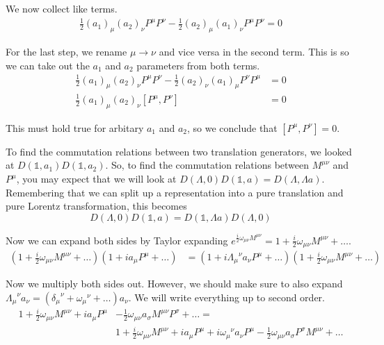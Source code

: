 \documentclass[12pt]{article}
\begin{document}
We now collect like terms.
\begin{align*}
    \frac{1}{2}(a_1)_\mu(a_2)_\nu P^\mu P^\nu-\frac{1}{2}(a_2)_\mu(a_1)_\nu P^\mu P^\nu = 0
\end{align*}

For the last step, we rename $\mu\rightarrow\nu$ and vice versa in the second term. This is so we can take out the $a_1$ and $a_2$ parameters from both terms.
\begin{align*}
    \frac{1}{2}(a_1)_\mu(a_2)_\nu P^\mu P^\nu-\frac{1}{2}(a_2)_\nu(a_1)_\mu P^\nu P^\mu &= 0 \\
    \frac{1}{2}(a_1)_\mu(a_2)_\nu [P^\mu,P^\nu]&=0
\end{align*}

This must hold true for arbitary $a_1$ and $a_2$, so we conclude that $[P^\mu,P^\nu]=0$.

To find the commutation relations between two translation generators, we looked at $D(\mathbb{1},a_1)D(\mathbb{1},a_2)$. So, to find the commutation relations between $M^{\mu\nu}$ and $P^\mu$, you may expect that we will look at $D(\Lambda,0)D(\mathbb{1},a)=D(\Lambda,\Lambda a)$. Remembering that we can split up a representation into a pure translation and pure Lorentz transformation, this becomes
\begin{equation}
    D(\Lambda,0)D(\mathbb{1},a)=D(\mathbb{1},\Lambda a)D(\Lambda, 0)
\end{equation}

Now we can expand both sides by Taylor expanding $e^{\frac{i}{2}\omega_{\mu\nu}M^{\mu\nu}}=1+\frac{i}{2}\omega_{\mu\nu}M^{\mu\nu}+\dots$.
\begin{align*}
    (1+\frac{i}{2}\omega_{\mu\nu}M^{\mu\nu}+\dots)(1+ia_\mu P^\mu+\dots)&=(1+i{\Lambda_\mu}^\nu a_\nu P^\mu +\dots)(1+\frac{i}{2}\omega_{\mu\nu}M^{\mu\nu}+\dots)
\end{align*}

Now we multiply both sides out. However, we should make sure to also expand ${\Lambda_\mu}^\nu a_\nu=({\delta_\mu}^\nu+{\omega_\mu}^\nu+\dots)a_\nu$. We will write everything up to second order.
\begin{align*}
    1+\frac{i}{2}\omega_{\mu\nu}M^{\mu\nu}+ia_\mu P^\mu&-\frac{1}{2}\omega_{\mu\nu}a_\sigma M^{\mu\nu}P^\sigma+\dots= \\
    &1+\frac{i}{2}\omega_{\mu\nu}M^{\mu\nu}+ia_\mu P^\mu+i{\omega_\mu}^\nu a_\nu P^\mu-\frac{1}{2}\omega_{\mu\nu}a_\sigma P^\sigma M^{\mu\nu}+\dots
\end{align*}
\end{document}

